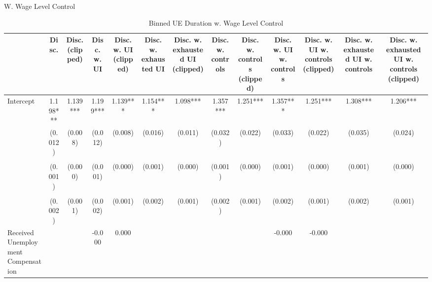 \documentclass[
]{article}
\begin{document}
W. Wage Level Control

\begin{table}[t]
\caption{\label{tab:unnamed-chunk-31}Binned UE Duration w. Wage Level Control} 
\fontsize{12.0pt}{14.4pt}\selectfont
\begin{tabular*}{\linewidth}{@{\extracolsep{\fill}}lcccccccccccc}
\toprule
  & Disc. & Disc. (clipped) & Disc. w. UI & Disc. w. UI (clipped) & Disc. w. exhausted UI & Disc. w. exhausted UI (clipped) & Disc. w. controls & Disc. w. controls (clipped) & Disc. w. UI w. controls & Disc. w. UI w. controls (clipped) & Disc. w. exhausted UI w. controls & Disc. w. exhausted UI w. controls (clipped) \\ 
\midrule\addlinespace[2.5pt]
Intercept & 1.198*** & 1.139*** & 1.199*** & 1.139*** & 1.154*** & 1.098*** & 1.357*** & 1.251*** & 1.357*** & 1.251*** & 1.308*** & 1.206*** \\ 
 & (0.012) & (0.008) & (0.012) & (0.008) & (0.016) & (0.011) & (0.032) & (0.022) & (0.033) & (0.022) & (0.035) & (0.024) \\ 
{\cellcolor[HTML]{ADD8E6}{Hourly Wage of Lost Job}} & {\cellcolor[HTML]{ADD8E6}{-0.009***}} & {\cellcolor[HTML]{ADD8E6}{-0.006***}} & {\cellcolor[HTML]{ADD8E6}{-0.009***}} & {\cellcolor[HTML]{ADD8E6}{-0.006***}} & {\cellcolor[HTML]{ADD8E6}{-0.009***}} & {\cellcolor[HTML]{ADD8E6}{-0.006***}} & {\cellcolor[HTML]{ADD8E6}{-0.011***}} & {\cellcolor[HTML]{ADD8E6}{-0.007***}} & {\cellcolor[HTML]{ADD8E6}{-0.011***}} & {\cellcolor[HTML]{ADD8E6}{-0.007***}} & {\cellcolor[HTML]{ADD8E6}{-0.011***}} & {\cellcolor[HTML]{ADD8E6}{-0.007***}} \\ 
 & (0.001) & (0.000) & (0.001) & (0.000) & (0.001) & (0.000) & (0.001) & (0.000) & (0.001) & (0.000) & (0.001) & (0.000) \\ 
{\cellcolor[HTML]{ADD8E6}{Unemployment Duration (Binned)}} & {\cellcolor[HTML]{ADD8E6}{-0.011***}} & {\cellcolor[HTML]{ADD8E6}{-0.009***}} & {\cellcolor[HTML]{ADD8E6}{-0.011***}} & {\cellcolor[HTML]{ADD8E6}{-0.009***}} & {\cellcolor[HTML]{ADD8E6}{-0.008***}} & {\cellcolor[HTML]{ADD8E6}{-0.005***}} & {\cellcolor[HTML]{ADD8E6}{-0.011***}} & {\cellcolor[HTML]{ADD8E6}{-0.008***}} & {\cellcolor[HTML]{ADD8E6}{-0.010***}} & {\cellcolor[HTML]{ADD8E6}{-0.008***}} & {\cellcolor[HTML]{ADD8E6}{-0.007***}} & {\cellcolor[HTML]{ADD8E6}{-0.005***}} \\ 
 & (0.002) & (0.001) & (0.002) & (0.001) & (0.002) & (0.001) & (0.002) & (0.001) & (0.002) & (0.001) & (0.002) & (0.001) \\ 
Received Unemployment Compensation &  &  & -0.000 & 0.000 &  &  &  &  & -0.000 & -0.000 &  &  \\ 

\end{tabular*}
\end{table}
\end{document}
